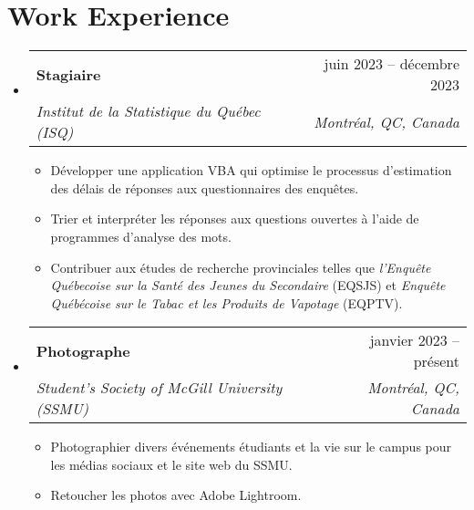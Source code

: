 \documentclass[letterpaper,11pt]{article}
\makeatletter
\newcommand{\resumeItem}[1]{
  \item{
    {#1 \vspace{-3pt}}
  }
}
\newcommand{\resumeSubheading}[4]{
  \vspace{-2pt}\item
    \begin{tabular*}{0.97\textwidth}[t]{l@{\extracolsep{\fill}}r}
      \textbf{#1} & #2 \\
      \textit{\small #3} & \textit{\small #4} \\
    \end{tabular*}\vspace{-10pt}
}
\newcommand{\resumeSubHeadingListStart}{\begin{itemize}[leftmargin=0.15in, label={}]}
\newcommand{\resumeSubHeadingListEnd}{\end{itemize}}
\newcommand{\resumeItemListStart}{\begin{itemize}}
\newcommand{\resumeItemListEnd}{\end{itemize}\vspace{-2pt}}
\makeatother
\begin{document}
%

\section{Work Experience}
\resumeSubHeadingListStart
    \resumeSubheading
      {Stagiaire}{juin 2023 -- décembre 2023}
      {Institut de la Statistique du Québec (ISQ)}{Montréal, QC, Canada}
      \resumeItemListStart
        \small\resumeItem{Développer une application VBA qui optimise le processus d'estimation des délais de réponses aux questionnaires des enquêtes.}
        \resumeItem{Trier et interpréter les réponses aux questions ouvertes à l'aide de programmes d'analyse des mots.}
        \resumeItem{Contribuer aux études de recherche provinciales telles que \textit{l'Enquête Québecoise sur la Santé des Jeunes du Secondaire} (EQSJS) et \textit{Enquête Québécoise sur le Tabac et les Produits de Vapotage} (EQPTV). }
        \resumeItemListEnd
\resumeSubHeadingListEnd
\resumeSubHeadingListStart
    \resumeSubheading
      {Photographe}{janvier 2023 -- présent}
      {Student's Society of McGill University (SSMU)}{Montréal, QC, Canada}
      \resumeItemListStart
        \small\resumeItem{Photographier divers événements étudiants et la vie sur le campus pour les médias sociaux et le site web du SSMU.}
        \resumeItem{Retoucher les photos avec Adobe Lightroom.}
        \resumeItemListEnd
\resumeSubHeadingListEnd

\end{document}
